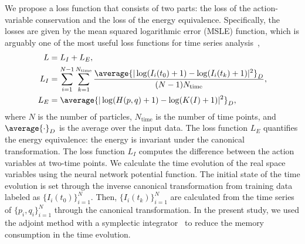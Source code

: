 We propose a loss function that consists of two parts: the loss of the action-variable conservation and the loss of the energy equivalence.
Specifically, the losses are given by the mean squared logarithmic error (MSLE) function, which is arguably one of the most useful loss functions for time series analysis~\cite{Liu-etal2017,Zhou-Huang2019,Van-etal2018},
\begin{align}
  \begin{split}
    L & = L_{I} + L_E , \\
    L_I & = \sum_{i=1}^{N-1}\sum_{k=1}^{N_{\mathrm{time}}}
    \frac{\average{|\log(I_i(t_0)+1) - \log(I_i(t_k)+1)|^2}_D}{(N-1)N_{\mathrm{time}}}, \\
    L_E & = \average{|\log(H(p,q)+1) - \log(K(I)+1)|^2}_D,
  \end{split} \label{eq:final_loss_function}
\end{align}
where $N$ is the number of particles, $N_\mathrm{time}$ is the number of time points, and $\average{\cdot}_D$ is the average over the input data.
The loss function $L_E$ quantifies the energy equivalence: the energy is invariant under the canonical transformation.
The loss function $L_I$ computes the difference between the action variables at two-time points.
We calculate the time evolution of the real space variables using the neural network potential function.
The initial state of the time evolution is set through the inverse canonical transformation from training data labeled as $\{I_i(t_0)\}_{i=1}^{N}$.
Then, $\{I_i(t_k)\}_{i=1}^{N}$ are calculated from the time series of $\{p_i,q_i\}_{i=1}^{N}$ through the canonical transformation.
In the present study, we used the adjoint method with a symplectic integrator~\cite{Sanz-Serna2016,NeuralODE} to reduce the memory consumption in the time evolution.
